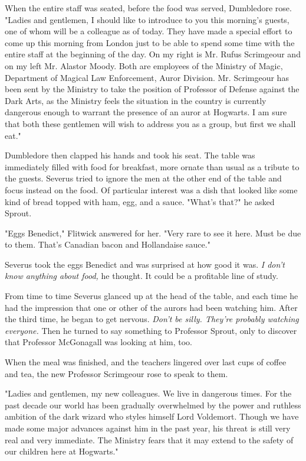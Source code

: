 \documentclass[a4paper,11pt]{article}
\begin{document}
When the entire staff was seated, before the food was served, Dumbledore rose. "Ladies and gentlemen, I should like to introduce to you this morning's guests, one of whom will be a colleague as of today. They have made a special effort to come up this morning from London just to be able to spend some time with the entire staff at the beginning of the day. On my right is Mr. Rufus Scrimgeour and on my left Mr. Alastor Moody. Both are employees of the Ministry of Magic, Department of Magical Law Enforcement, Auror Division. Mr. Scrimgeour has been sent by the Ministry to take the position of Professor of Defense against the Dark Arts, as the Ministry feels the situation in the country is currently dangerous enough to warrant the presence of an auror at Hogwarts. I am sure that both these gentlemen will wish to address you as a group, but first we shall eat."

Dumbledore then clapped his hands and took his seat. The table was immediately filled with food for breakfast, more ornate than usual as a tribute to the guests. Severus tried to ignore the men at the other end of the table and focus instead on the food. Of particular interest was a dish that looked like some kind of bread topped with ham, egg, and a sauce. "What's that?" he asked Sprout.

"Eggs Benedict," Flitwick answered for her. "Very rare to see it here. Must be due to them. That's Canadian bacon and Hollandaise sauce."

Severus took the eggs Benedict and was surprised at how good it was. \emph{I don't know anything about food,} he thought. It could be a profitable line of study.

From time to time Severus glanced up at the head of the table, and each time he had the impression that one or other of the aurors had been watching him. After the third time, he began to get nervous. \emph{Don't be silly. They're probably watching everyone.} Then he turned to say something to Professor Sprout, only to discover that Professor McGonagall was looking at him, too.

When the meal was finished, and the teachers lingered over last cups of coffee and tea, the new Professor Scrimgeour rose to speak to them.

"Ladies and gentlemen, my new colleagues. We live in dangerous times. For the past decade our world has been gradually overwhelmed by the power and ruthless ambition of the dark wizard who styles himself Lord Voldemort. Though we have made some major advances against him in the past year, his threat is still very real and very immediate. The Ministry fears that it may extend to the safety of our children here at Hogwarts."
\end{document}
